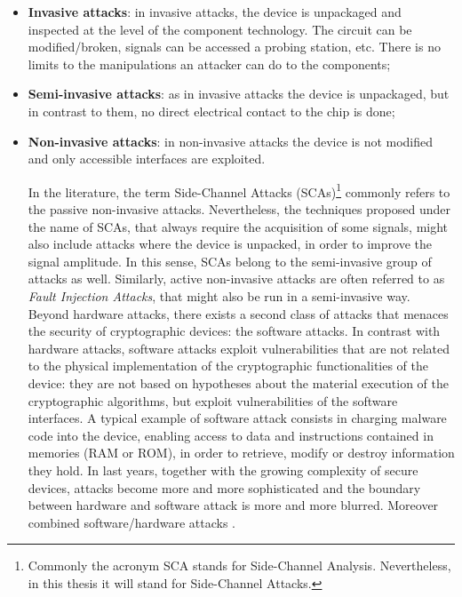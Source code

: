 \begin{itemize}
\item[] \textbf{Invasive attacks}: in invasive attacks, the device is unpackaged and inspected at the level of the component technology. The circuit can be modified/broken, signals can be accessed \via a probing station, etc. There is no limits to the manipulations an attacker can do to the components;
\item[] \textbf{Semi-invasive attacks}: as in invasive attacks the device is unpackaged, but in contrast to them, no direct electrical contact to the chip is done;
\item[] \textbf{Non-invasive attacks}: in non-invasive attacks the device is not modified and only accessible interfaces are exploited. 

In the literature, the term Side-Channel Attacks (SCAs)\footnote{Commonly the acronym SCA stands for \textquotedbl Side-Channel Analysis\textquotedbl. Nevertheless, in this thesis it will stand for \textquotedbl Side-Channel Attacks\textquotedbl.} commonly refers to the passive non-invasive attacks. Nevertheless, the techniques proposed under the name of SCAs, that always require the acquisition of some signals, might also include attacks where the device is unpacked, in order to improve the signal amplitude. In this sense, SCAs belong to the semi-invasive group of attacks as well. Similarly, active non-invasive attacks are often referred to as \emph{Fault Injection Attacks}, that might also be run in a semi-invasive way.\\

Beyond hardware attacks, there exists a second class of attacks that menaces the security of cryptographic devices: the software attacks. In contrast with hardware attacks, software attacks exploit vulnerabilities that are not related to the physical implementation of the cryptographic functionalities of the device: they are not based on hypotheses about the material execution of the cryptographic algorithms, but exploit vulnerabilities of the software interfaces. A typical example of software attack consists in charging malware code into the device, enabling access to data and instructions contained in memories (RAM or ROM), in order to retrieve, modify or destroy information they hold. In last years, together with the growing complexity of secure devices, attacks become more and more sophisticated and the boundary between hardware and software attack is more and more blurred. Moreover combined software/hardware attacks \cite{}.


\end{itemize}


